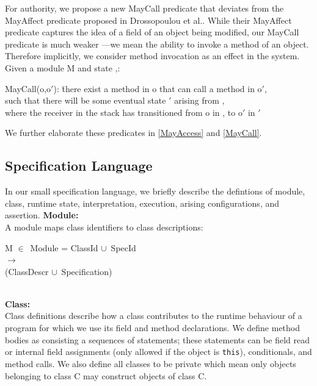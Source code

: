 \documentclass[a4paper,11pt,twoside]{article}
\newenvironment{logic}
{\begin{minipage}[c]{\linewidth}  \sffamily \mdseries \begin{tabbing}}
{\end{tabbing}\end{minipage}\vspace{0.3em}}
\newcommand{\loin}{$\in$}
\newcommand{\losigma}{\text{$\upsigma$}}
\newcommand{\locup} {$\cup$}
\newcommand{\ablock} {\null\qquad}
\begin{document}
For authority, we propose a new MayCall predicate that deviates from the MayAffect predicate proposed in Drossopoulou et al.\cite{drossopoulou2016}. While their MayAffect predicate captures the idea of a field of an object being modified, our MayCall predicate is much weaker ---we mean the ability to invoke a method of an object. Therefore implicitly, we consider method invocation as an effect in the system. Given a module M and state \losigma,:
\begin{tabbing}
MayCall(o,o$'$): \=there exist a method in o that can call a method in o$'$,\\ \> such that there will be some eventual state \losigma$'$ arising from \losigma,\\ \> where the receiver in the stack has transitioned from o in \losigma, to o$'$ in \losigma$'$\\
\end{tabbing}

We further elaborate these predicates in \cref{MayAccess} and \cref{MayCall}.
\subsection{Specification Language}\label{sec:speclang}
In our small specification language, we briefly describe the defintions of module, class, runtime state, interpretation, execution, arising configurations, and assertion.
\textbf{Module:}\\
A module maps class identifiers to class descriptions:\\
\begin{logic}
M \loin\ Module = ClassId \locup\ SpecId\\\ablock\qquad\qquad\quad $\rightarrow$ \\
\ablock \qquad \qquad \quad (ClassDescr \locup\ Specification)
\end{logic}\\

\textbf{Class:}\\
Class definitions describe how a class contributes to the runtime behaviour of a program for which we use its field and method declarations. We define method bodies as consisting a sequences of statements; these statements can be field read or internal field assignments (only allowed if the object is \texttt{this}), conditionals, and method calls. We also define all classes to be private which mean only objects belonging to class C may construct objects of class C.\\
\end{document}
